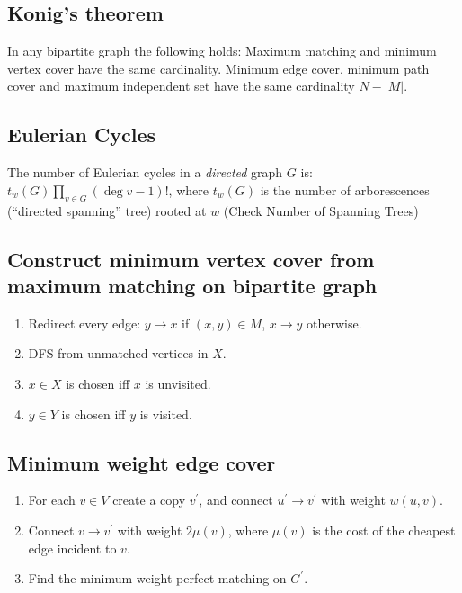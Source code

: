 \subsection{Konig's theorem}
In any bipartite graph the following holds: Maximum matching and minimum vertex cover have the same cardinality.
Minimum edge cover, minimum path cover and maximum independent set have the same cardinality $N - |M|$.\\

\subsection{Eulerian Cycles}
The number of Eulerian cycles in a \emph{directed} graph $G$ is: $t_w(G) \prod_{v \in G} (\deg v - 1)!$,
where $t_w(G)$ is the number of arborescences (``directed spanning'' tree) rooted at $w$
(Check Number of Spanning Trees)\\


\subsection{Construct minimum vertex cover from maximum matching on bipartite graph}
\vspace{-0.2em}
\begin{enumerate}
	\itemsep-0.8em
	\item Redirect every edge: $y \rightarrow x$ if $(x, y) \in M$, $x \rightarrow y$ otherwise.
	\item DFS from unmatched vertices in $X$.
	\item $x \in X$ is chosen iff $x$ is unvisited.
	\item $y \in Y$ is chosen iff $y$ is visited.
\end{enumerate}

\subsection{Minimum weight edge cover}
\vspace{-0.2em}
    \begin{enumerate}
	  \itemsep-0.8em
      \item For each $v \in V$ create a copy $v^\prime$, and connect $u^\prime \to v^\prime$ with weight $w(u, v)$.
      \item Connect $v \to v^\prime$ with weight $2\mu(v)$, where $\mu(v)$ is the cost of the cheapest edge incident to $v$.
      \item Find the minimum weight perfect matching on $G^\prime$.
    \end{enumerate}

